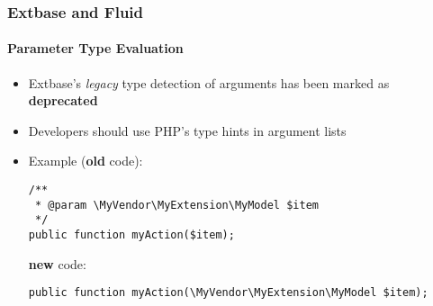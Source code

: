 %

\begin{frame}[fragile]
	\frametitle{Extbase and Fluid}
	\framesubtitle{Parameter Type Evaluation}


	\begin{itemize}
		\item Extbase's \textit{legacy} type detection of arguments has been
			marked as \textbf{deprecated}
		\item Developers should use PHP's type hints in argument lists
		\item Example (\textbf{old} code):
\begin{lstlisting}
/**
 * @param \MyVendor\MyExtension\MyModel $item
 */
public function myAction($item);
\end{lstlisting}
			\textbf{new} code:
\begin{lstlisting}
public function myAction(\MyVendor\MyExtension\MyModel $item);
\end{lstlisting}

	\end{itemize}

\end{frame}

